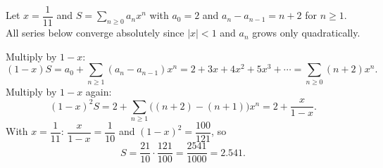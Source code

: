 Let $x=\dfrac{1}{11}$ and $S=\sum_{n\ge0}a_nx^n$ with $a_0=2$ and $a_n-a_{n-1}=n+2$ for $n\ge1$. All series below converge absolutely since $|x|<1$ and $a_n$ grows only quadratically.

Multiply by $1-x$:
\[
(1-x)S=a_0+\sum_{n\ge1}(a_n-a_{n-1})x^n=2+3x+4x^2+5x^3+\cdots=\sum_{n\ge0}(n+2)x^n .
\]
Multiply by $1-x$ again:
\[
(1-x)^2S=2+\sum_{n\ge1}\bigl((n+2)-(n+1)\bigr)x^n=2+\dfrac{x}{1-x}.
\]
With $x=\dfrac{1}{11}$: $\dfrac{x}{1-x}=\dfrac{1}{10}$ and $(1-x)^2=\dfrac{100}{121}$, so
\[
S=\dfrac{21}{10}\cdot\dfrac{121}{100}=\boxed{\dfrac{2541}{1000}}=2.541 .
\]
